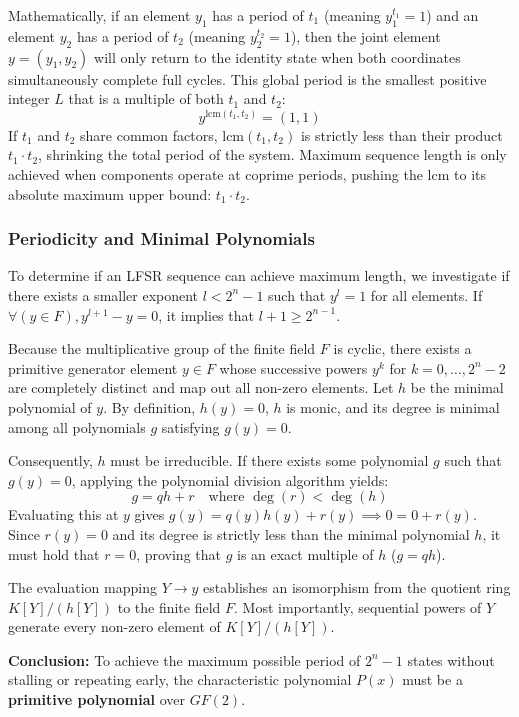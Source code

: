 Mathematically, if an element $y_1$ has a period of $t_1$ (meaning $y_1^{t_1} = 1$) and an element $y_2$ has a period of $t_2$ (meaning $y_2^{t_2} = 1$), then the joint element $y = (y_1, y_2)$ will only return to the identity state when both coordinates simultaneously complete full cycles. This global period is the smallest positive integer $L$ that is a multiple of both $t_1$ and $t_2$:
\[
y^{\text{lcm}(t_1, t_2)} = (1, 1)
\]
If $t_1$ and $t_2$ share common factors, $\text{lcm}(t_1, t_2)$ is strictly less than their product $t_1 \cdot t_2$, shrinking the total period of the system. Maximum sequence length is only achieved when components operate at coprime periods, pushing the $\text{lcm}$ to its absolute maximum upper bound: $t_1 \cdot t_2$.

\subsubsection{Periodicity and Minimal Polynomials}
To determine if an LFSR sequence can achieve maximum length, we investigate if there exists a smaller exponent $l < 2^n - 1$ such that $y^l = 1$ for all elements. If $\forall (y \in F), y^{l+1} - y = 0$, it implies that $l + 1 \geq 2^{n-1}$. 

Because the multiplicative group of the finite field $F$ is cyclic, there exists a primitive generator element $y \in F$ whose successive powers $y^k$ for $k = 0, \dots, 2^n - 2$ are completely distinct and map out all non-zero elements. Let $h$ be the minimal polynomial of $y$. By definition, $h(y) = 0$, $h$ is monic, and its degree is minimal among all polynomials $g$ satisfying $g(y) = 0$. 

Consequently, $h$ must be irreducible. If there exists some polynomial $g$ such that $g(y) = 0$, applying the polynomial division algorithm yields:
\[
g = qh + r \quad \text{where } \deg(r) < \deg(h)
\]
Evaluating this at $y$ gives $g(y) = q(y)h(y) + r(y) \implies 0 = 0 + r(y)$. Since $r(y) = 0$ and its degree is strictly less than the minimal polynomial $h$, it must hold that $r = 0$, proving that $g$ is an exact multiple of $h$ ($g = qh$).

The evaluation mapping $Y \rightarrow y$ establishes an isomorphism from the quotient ring $K[Y]/(h[Y])$ to the finite field $F$. Most importantly, sequential powers of $Y$ generate every non-zero element of $K[Y]/(h[Y])$.

\textbf{Conclusion:} To achieve the maximum possible period of $2^n-1$ states without stalling or repeating early, the characteristic polynomial $P(x)$ must be a \textbf{primitive polynomial} over $GF(2)$.


